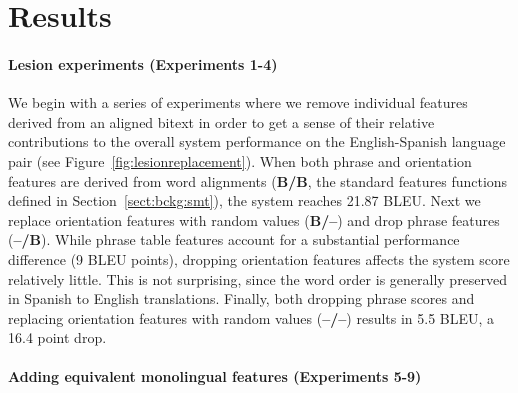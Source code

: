 \documentclass[11pt]{article}
\newcommand{\secref}[1]{Section~\ref{#1}}
\newcommand{\figref}[1]{Figure~\ref{#1}}
\begin{document}

\section{Results} \label{sect:results}

\paragraph{Lesion experiments (Experiments 1-4)}  \label{sect:exp:lesions}

We begin with a series of experiments where we remove individual features derived from an aligned bitext in order to get a sense of their relative contributions to the overall system performance on the English-Spanish language pair (see \figref{fig:lesionreplacement}). When both phrase and orientation features are derived from word alignments ({\bf B/B}, the standard features functions defined in \secref{sect:bckg:smt}), the system reaches 21.87 BLEU.  Next we replace orientation features with random values ({\bf B/--}) and drop phrase features ({\bf --/B}).  While phrase table features account for a substantial performance difference (9 BLEU points), dropping orientation features affects the system score relatively little.  This is not surprising, since the word order is generally preserved in Spanish to English translations.  Finally, both dropping phrase scores and replacing orientation features with random values ({\bf --/--}) results in 5.5 BLEU, a 16.4 point drop.

\paragraph{Adding equivalent monolingual features (Experiments 5-9)} \label{sect:exp:replacement}
\end{document}

